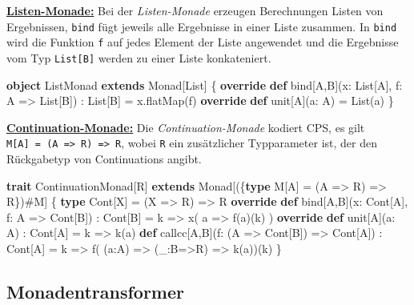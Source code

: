 \documentclass[]{article}
\newenvironment{Shaded}{}{}
\newcommand{\DataTypeTok}[1]{\textcolor[rgb]{0.56,0.13,0.00}{#1}}
\newcommand{\FunctionTok}[1]{\textcolor[rgb]{0.02,0.16,0.49}{#1}}
\newcommand{\KeywordTok}[1]{\textcolor[rgb]{0.00,0.44,0.13}{\textbf{#1}}}
\newcommand{\NormalTok}[1]{#1}
\begin{document}
\underline{\textbf{Listen-Monade:}} Bei der \emph{Listen-Monade} erzeugen
Berechnungen Listen von Ergebnissen, \texttt{bind} fügt jeweils alle
Ergebnisse in einer Liste zusammen. In \texttt{bind} wird die Funktion
\texttt{f} auf jedes Element der Liste angewendet und die Ergebnisse vom
Typ \texttt{List{[}B{]}} werden zu einer Liste konkateniert.

\begin{Shaded}
\begin{Highlighting}[]
\KeywordTok{object}\NormalTok{ ListMonad }\KeywordTok{extends}\NormalTok{ Monad[List] \{}
  \KeywordTok{override} \KeywordTok{def}\NormalTok{ bind[A,B](x: List[A], f: A =\textgreater{} List[B]) : List[B] = x.}\FunctionTok{flatMap}\NormalTok{(f)}
  \KeywordTok{override} \KeywordTok{def} \DataTypeTok{unit}\NormalTok{[A](a: A) = List(a)}
\NormalTok{\}}
\end{Highlighting}
\end{Shaded}

\underline{\textbf{Continuation-Monade:}} Die \emph{Continuation-Monade} kodiert
CPS, es gilt
\texttt{M{[}A{]}\ =\ (A\ =\textgreater{}\ R)\ =\textgreater{}\ R}, wobei
\texttt{R} ein zusätzlicher Typparameter ist, der den Rückgabetyp von
Continuations angibt.

\begin{Shaded}
\begin{Highlighting}[]
\KeywordTok{trait}\NormalTok{ ContinuationMonad[R] }\KeywordTok{extends}\NormalTok{ Monad[(\{}\KeywordTok{type}\NormalTok{ M[A] = (A =\textgreater{} R) =\textgreater{} R\})\#M] \{}
  \KeywordTok{type}\NormalTok{ Cont[X] = (X =\textgreater{} R) =\textgreater{} R}
  \KeywordTok{override} \KeywordTok{def}\NormalTok{ bind[A,B](x: Cont[A], f: A =\textgreater{} Cont[B]) : Cont[B] = }
\NormalTok{     k =\textgreater{} }\FunctionTok{x}\NormalTok{( a =\textgreater{} }\FunctionTok{f}\NormalTok{(a)(k) )}
  \KeywordTok{override} \KeywordTok{def} \DataTypeTok{unit}\NormalTok{[A](a: A) : Cont[A] = k =\textgreater{} }\FunctionTok{k}\NormalTok{(a)}
  \KeywordTok{def}\NormalTok{ callcc[A,B](f: (A =\textgreater{} Cont[B]) =\textgreater{} Cont[A]) : Cont[A] = }
\NormalTok{    k =\textgreater{} }\FunctionTok{f}\NormalTok{( (a:A) =\textgreater{} (\_:B=\textgreater{}R) =\textgreater{} }\FunctionTok{k}\NormalTok{(a))(k)}
\NormalTok{\}}
\end{Highlighting}
\end{Shaded}

\hypertarget{monadentransformer}{%
\subsection{Monadentransformer}\label{monadentransformer}}
\end{document}
